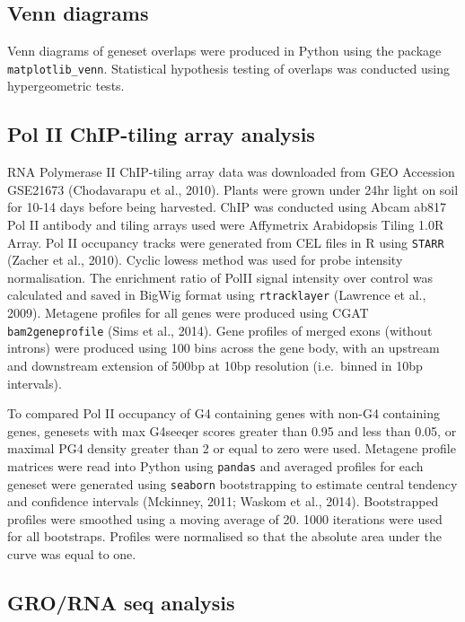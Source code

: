 \documentclass[12pt,a4paper,]{report}
\begin{document}
\hypertarget{venn-diagrams}{%
\subsection{Venn diagrams}\label{venn-diagrams}}

Venn diagrams of geneset overlaps were produced in Python using the
package \texttt{matplotlib\_venn}. Statistical hypothesis testing of
overlaps was conducted using hypergeometric tests.

\hypertarget{pol-ii-chip-tiling-array-analysis}{%
\subsection{Pol II ChIP-tiling array
analysis}\label{pol-ii-chip-tiling-array-analysis}}

RNA Polymerase II ChIP-tiling array data was downloaded from GEO
Accession GSE21673 (Chodavarapu et al., 2010). Plants were grown under
24hr light on soil for 10-14 days before being harvested. ChIP was
conducted using Abcam ab817 Pol II antibody and tiling arrays used were
Affymetrix Arabidopsis Tiling 1.0R Array. Pol II occupancy tracks were
generated from CEL files in R using \texttt{STARR} (Zacher et al.,
2010). Cyclic lowess method was used for probe intensity normalisation.
The enrichment ratio of PolII signal intensity over control was
calculated and saved in BigWig format using \texttt{rtracklayer}
(Lawrence et al., 2009). Metagene profiles for all genes were produced
using CGAT \texttt{bam2geneprofile} (Sims et al., 2014). Gene profiles
of merged exons (without introns) were produced using 100 bins across
the gene body, with an upstream and downstream extension of 500bp at
10bp resolution (i.e.~binned in 10bp intervals).

To compared Pol II occupancy of G4 containing genes with non-G4
containing genes, genesets with max G4seeqer scores greater than 0.95
and less than 0.05, or maximal PG4 density greater than 2 or equal to
zero were used. Metagene profile matrices were read into Python using
\texttt{pandas} and averaged profiles for each geneset were generated
using \texttt{seaborn} bootstrapping to estimate central tendency and
confidence intervals (Mckinney, 2011; Waskom et al., 2014). Bootstrapped
profiles were smoothed using a moving average of 20. 1000 iterations
were used for all bootstraps. Profiles were normalised so that the
absolute area under the curve was equal to one.

\hypertarget{grorna-seq-analysis}{%
\subsection{GRO/RNA seq analysis}\label{grorna-seq-analysis}}
\end{document}

